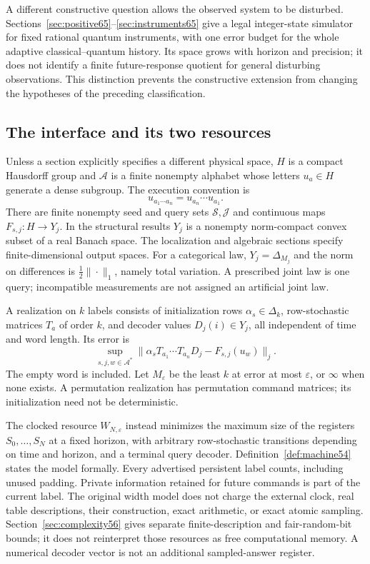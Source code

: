 A different constructive question allows the observed system to be
disturbed. Sections~\ref{sec:positive65}--\ref{sec:instruments65}
give a legal integer-state simulator for fixed rational quantum
instruments, with one error budget for the whole adaptive
classical--quantum history. Its space grows with horizon and precision;
it does not identify a finite future-response quotient for general
disturbing observations. This distinction prevents the constructive
extension from changing the hypotheses of the preceding classification.

\subsection{The interface and its two resources}
Unless a section explicitly specifies a different physical space, $H$ is a compact Hausdorff group and $\mathcal A$ is a finite nonempty alphabet whose letters $u_a\in H$ generate a dense subgroup. The execution convention is
\[
                  u_{a_1\cdots a_n}=u_{a_n}\cdots u_{a_1}.
\]
There are finite nonempty seed and query sets $\mathcal S,\mathcal J$ and continuous maps $F_{s,j}:H\to Y_j$. In the structural results $Y_j$ is a nonempty norm-compact convex subset of a real Banach space. The localization and algebraic sections specify finite-dimensional output spaces. For a categorical law, $Y_j=\Delta_{M_j}$ and the norm on differences is $\frac12\|\cdot\|_1$, namely total variation. A prescribed joint law is one query; incompatible measurements are not assigned an artificial joint law.

\begin{definition}\label{def:stationary55}
A realization on $k$ labels consists of initialization rows $\alpha_s\in\Delta_k$, row-stochastic matrices $T_a$ of order $k$, and decoder values $D_j(i)\in Y_j$, all independent of time and word length. Its error is
\[
       \sup_{s,j,w\in\mathcal A^*}
        \|\alpha_sT_{a_1}\cdots T_{a_n}D_j-F_{s,j}(u_w)\|_j.
\]
The empty word is included. Let $M_\varepsilon$ be the least $k$ at error at most $\varepsilon$, or $\infty$ when none exists. A permutation realization has permutation command matrices; its initialization need not be deterministic.
\end{definition}
The clocked resource $W_{N,\varepsilon}$ instead minimizes the maximum size of the registers $S_0,\ldots,S_N$ at a fixed horizon, with arbitrary row-stochastic transitions depending on time and horizon, and a terminal query decoder. Definition~\ref{def:machine54} states the model formally. Every advertised persistent label counts, including unused padding. Private information retained for future commands is part of the current label. The original width model does not charge the external clock, real table descriptions, their construction, exact arithmetic, or exact atomic sampling. Section~\ref{sec:complexity56} gives separate finite-description and fair-random-bit bounds; it does not reinterpret those resources as free computational memory. A numerical decoder vector is not an additional sampled-answer register.

